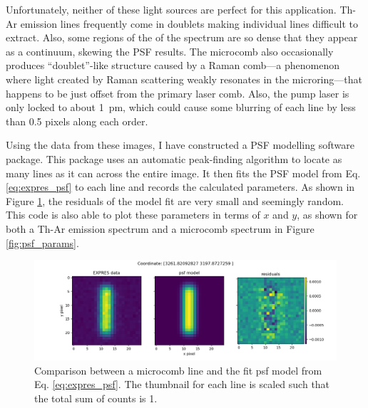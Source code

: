 \documentclass[11pt]{article}
\begin{document}
Unfortunately, neither of these light sources are perfect for this application. Th-Ar emission lines frequently come in doublets making individual lines difficult to extract. Also, some regions of the of the spectrum are so dense that they appear as a continuum, skewing the PSF results. The microcomb also occasionally produces ``doublet''-like structure caused by a Raman comb---a phenomenon where light created by Raman scattering weakly resonates in the microring---that happens to be just offset from the primary laser comb. Also, the pump laser is only locked to about \SI{1}{\pico\meter}, which could cause some blurring of each line by less than 0.5 pixels along each order.

Using the data from these images, I have constructed a PSF modelling software package. This package uses an automatic peak-finding algorithm to locate as many lines as it can across the entire image. It then fits the PSF model from Eq. \ref{eq:expres_psf} to each line and records the calculated parameters. As shown in Figure \ref{fig:psf_comparison}, the residuals of the model fit are very small and seemingly random. This code is also able to plot these parameters in terms of $x$ and $y$, as shown for both a Th-Ar emission spectrum and a microcomb spectrum in Figure \ref{fig:psf_params}.

\begin{figure}
    \centering
    \includegraphics[width=\textwidth]{images/psf_comparison.png}
    \caption{Comparison between a microcomb line and the fit psf model from Eq. \ref{eq:expres_psf}. The thumbnail for each line is scaled such that the total sum of counts is 1.}
    \label{fig:psf_comparison}
\end{figure}
\end{document}
